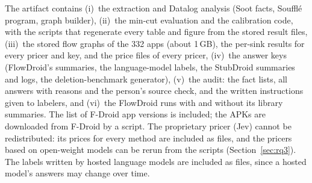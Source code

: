 The artifact contains (i)~the extraction and Datalog analysis (Soot facts, Souffl\'e program, graph builder), (ii)~the min-cut evaluation and the calibration code, with the scripts that regenerate every table and figure from the stored result files, (iii)~the stored flow graphs of the 332 apps (about 1\,GB), the per-sink results for every pricer and key, and the price files of every pricer, (iv)~the answer keys (FlowDroid's summaries, the language-model labels, the StubDroid summaries and logs, the deletion-benchmark generator), (v)~the audit: the fact lists, all answers with reasons and the person's source check, and the written instructions given to labelers, and (vi)~the FlowDroid runs with and without its library summaries.
The list of F-Droid app versions is included; the APKs are downloaded from F-Droid by a script.
The proprietary pricer (Jev) cannot be redistributed: its prices for every method are included as files, and the pricers based on open-weight models can be rerun from the scripts (Section~\ref{sec:rq3}).
The labels written by hosted language models are included as files, since a hosted model's answers may change over time.

